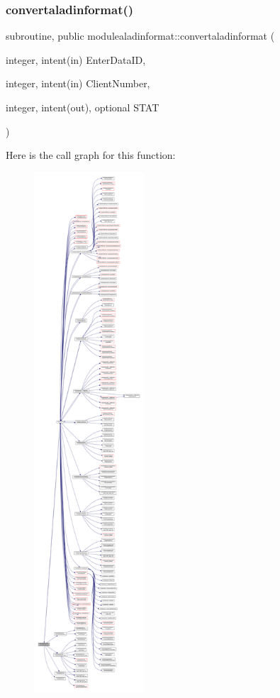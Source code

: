 \subsubsection{\texorpdfstring{convertaladinformat()}{convertaladinformat()}}
{\footnotesize\ttfamily subroutine, public modulealadinformat\+::convertaladinformat (\begin{DoxyParamCaption}\item[{integer, intent(in)}]{Enter\+Data\+ID,  }\item[{integer, intent(in)}]{Client\+Number,  }\item[{integer, intent(out), optional}]{S\+T\+AT }\end{DoxyParamCaption})}

Here is the call graph for this function\+:\nopagebreak
\begin{figure}[H]
\begin{center}
\leavevmode
\includegraphics[height=550pt]{namespacemodulealadinformat_a77f6d15bb472ac521ff23ef7a54a48e7_cgraph}
\end{center}
\end{figure}
